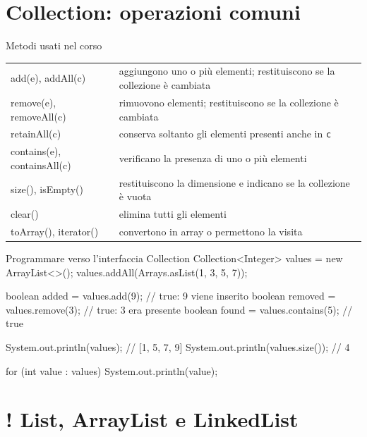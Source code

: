 ﻿\documentclass[10pt,a4paper]{article}
\newcommand{\cmd}[1]{\texttt{#1}}
\DeclareRobustCommand{\exammark}{%
  \texorpdfstring{\textcolor{examred}{\bfseries\Large !}\hspace{.18em}}{! }%
}
\newcommand{\topicsection}[1]{\Needspace{12\baselineskip}\section{#1}}
\newenvironment{topicblock}{%
  \par\medskip\noindent\begin{minipage}{\textwidth}%
}{%
  \end{minipage}\par\medskip%
}
\begin{document}
\begin{topicblock}
\topicsection{Collection: operazioni comuni}

\begin{concept}{Metodi usati nel corso}
\begin{tabularx}{\textwidth}{>{\ttfamily}l X}
add(e), addAll(c) & aggiungono uno o più elementi; restituiscono se la collezione è cambiata \\
remove(e), removeAll(c) & rimuovono elementi; restituiscono se la collezione è cambiata \\
retainAll(c) & conserva soltanto gli elementi presenti anche in \cmd{c} \\
contains(e), containsAll(c) & verificano la presenza di uno o più elementi \\
size(), isEmpty() & restituiscono la dimensione e indicano se la collezione è vuota \\
clear() & elimina tutti gli elementi \\
toArray(), iterator() & convertono in array o permettono la visita \\
\end{tabularx}
\end{concept}

\begin{codebox}{Programmare verso l'interfaccia Collection}
Collection<Integer> values = new ArrayList<>();
values.addAll(Arrays.asList(1, 3, 5, 7));

boolean added = values.add(9);    // true: 9 viene inserito
boolean removed = values.remove(3); // true: 3 era presente
boolean found = values.contains(5); // true

System.out.println(values);       // [1, 5, 7, 9]
System.out.println(values.size()); // 4

for (int value : values) {
    System.out.println(value);
}
\end{codebox}

\end{topicblock}
\topicsection{\exammark List, ArrayList e LinkedList}
\end{document}
